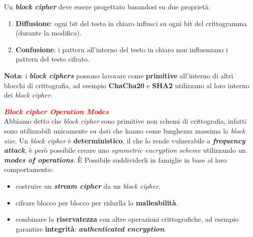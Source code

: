 \begin{flushleft}
    \bigskip
    
    Un \textbf{\textit{block cipher}} deve essere progettato basandosi su due proprietà:
    \begin{enumerate}[nosep]
        \item \textbf{Diffusione}: ogni bit del testo in chiaro influsci su ogni bit del crittogramma (durante la modifica).
        \item \textbf{Confusione}: i pattern all'interno del testo in chiaro non influenzano i pattern del testo cifrato.
    \end{enumerate}

    \textbf{Nota}: i \textbf{\textit{block ciphers}} possono lavorare come \textbf{primitive} all'interno di altri blocchi di crittografia, ad esempio \textbf{ChaCha20} e \textbf{SHA2} utilizzano al loro interno dei \textit{block cipher}.
\end{flushleft}

\begin{flushleft}
    \textcolor{red}{\textbf{\textit{Block cipher Operation Modes}}} \\
    Abbiamo detto che \textit{block cipher} sono primitive non schemi di crittografia, infatti sono utilizzabili unicamente su dati che hanno come lunghezza massima la \textit{block size}. Un \textit{block cipher} è \textbf{deterministico}, il che lo rende vulnerabile a \textbf{\textit{frequency attack}}, è però possibile creare uno \textit{symmetric encryption scheme} utilizzando un \textbf{\textit{modes of operations}}. È Possibile suddividerli in famiglie in base al loro comportamento:
    \begin{itemize}[nosep]
        \item costruire un \textbf{\textit{stream cipher}} da un \textit{block cipher}.
        \item cifrare blocco per blocco per ridurlla la \textbf{malleabilità}.
        \item combinare la \textbf{riservatezza} con altre operazioni crittografiche, ad esempio garantire \textbf{integrità}: \textbf{\textit{authenticated encryption}}.
    \end{itemize}
\end{flushleft}

